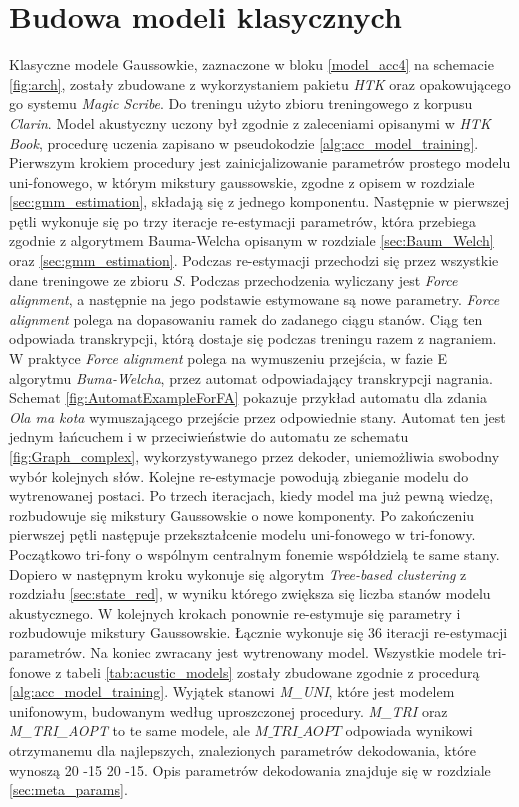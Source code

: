 \documentclass[shortabstract, mgr]{iithesis}
\newcommand{\refBlock}[1]{
	\hyperref[#1]{\ref*{#1}}
}
\begin{document}
	\section{Budowa modeli klasycznych}
		Klasyczne modele Gaussowkie, zaznaczone w bloku \refBlock{model_acc4} na schemacie \ref{fig:arch}, zostały zbudowane z wykorzystaniem pakietu \textit{HTK} oraz opakowującego go systemu \textit{Magic Scribe}. Do treningu użyto zbioru treningowego z korpusu \textit{Clarin}. Model akustyczny uczony był zgodnie z zaleceniami opisanymi w \textit{HTK Book}\cite{htkbook}, procedurę uczenia zapisano w pseudokodzie \ref{alg:acc_model_training}. Pierwszym krokiem procedury jest zainicjalizowanie parametrów prostego modelu uni-fonowego, w którym mikstury gaussowskie, zgodne z opisem w rozdziale \ref{sec:gmm_estimation}, składają się z jednego komponentu. Następnie w pierwszej pętli wykonuje się po trzy iteracje re-estymacji parametrów, która przebiega zgodnie z algorytmem Bauma-Welcha opisanym w rozdziale \ref{sec:Baum_Welch} oraz \ref{sec:gmm_estimation}. Podczas re-estymacji przechodzi się przez wszystkie dane treningowe ze zbioru $S$. Podczas przechodzenia wyliczany jest \textit{Force alignment}, a następnie na jego podstawie estymowane są nowe parametry. \textit{Force alignment} polega na dopasowaniu ramek do zadanego ciągu stanów. Ciąg ten odpowiada transkrypcji, którą dostaje się podczas treningu razem z nagraniem. W praktyce \textit{Force alignment} polega na wymuszeniu przejścia, w fazie E algorytmu \textit{Buma-Welcha}, przez automat odpowiadający transkrypcji nagrania. Schemat \ref{fig:AutomatExampleForFA} pokazuje przykład automatu dla zdania \textit{Ola ma kota} wymuszającego przejście przez odpowiednie stany. Automat ten jest jednym łańcuchem i w przeciwieństwie do automatu ze schematu \ref{fig:Graph_complex}, wykorzystywanego przez dekoder, uniemożliwia swobodny wybór kolejnych słów. Kolejne re-estymacje powodują zbieganie modelu do wytrenowanej postaci. Po trzech iteracjach, kiedy model ma już pewną wiedzę, rozbudowuje się mikstury Gaussowskie o nowe komponenty. Po zakończeniu pierwszej pętli następuje przekształcenie modelu uni-fonowego w tri-fonowy. Początkowo tri-fony o wspólnym centralnym fonemie współdzielą te same stany. Dopiero w następnym kroku wykonuje się algorytm \textit{Tree-based clustering} z rozdziału \ref{sec:state_red}, w wyniku którego zwiększa się liczba stanów modelu akustycznego. W kolejnych krokach ponownie re-estymuje się parametry i rozbudowuje mikstury Gaussowskie. Łącznie wykonuje się $36$ iteracji re-estymacji parametrów. Na koniec zwracany jest wytrenowany model. Wszystkie modele tri-fonowe z tabeli \ref{tab:acustic_models} zostały zbudowane zgodnie z procedurą \ref{alg:acc_model_training}. Wyjątek stanowi \textit{M\_UNI}, które jest modelem unifonowym, budowanym według uproszczonej procedury. \textit{M\_TRI} oraz \textit{M\_TRI\_AOPT} to te same modele, ale $M\_TRI\_AOPT$ odpowiada wynikowi otrzymanemu dla najlepszych, znalezionych parametrów dekodowania, które wynoszą 20 -15 20 -15. Opis parametrów dekodowania znajduje się w rozdziale \ref{sec:meta_params}.
		
\end{document}
